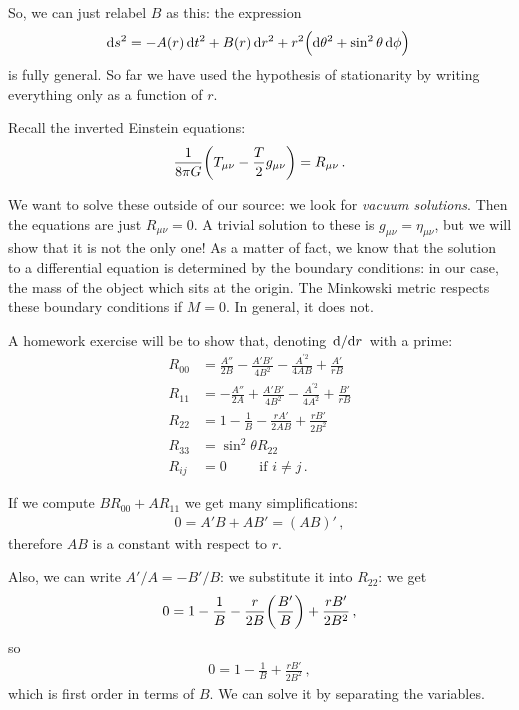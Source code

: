 \documentclass[main.tex]{subfiles}
\begin{document}
So, we can just relabel \(B\) as this: the expression 
%
\begin{align}
    \dd{s^2} = -A(r) \dd{t^2} + B(r) \dd{r^2} + r^2\qty(\dd{\theta^2} + \sin^2 \theta \dd{\phi })
\,
\end{align}
%
is fully general. So far we have used the hypothesis of stationarity by writing everything only as a function of \(r\).

Recall the inverted Einstein equations: 
%
\begin{align}
  \frac{1}{8 \pi G} \qty(T_{\mu \nu } - \frac{T}{2} g_{\mu \nu }) = R_{\mu \nu }
\,.
\end{align}
%

We want to solve these outside of our source: we look for \emph{vacuum solutions}. Then the equations are just \(R_{\mu \nu } =0\).
A trivial solution to these is \(g_{\mu \nu } = \eta_{\mu \nu }\), but we will show that it is not the only one!
As a matter of fact, we know that the solution to a differential equation is determined by the boundary conditions: in our case, the mass of the object which sits at the origin.
The Minkowski metric respects these boundary conditions if \(M=0\). In general, it does not.

A homework exercise will be to show that, denoting \(\dv*{}{r}\) with a prime: 
%
\begin{subequations}
\begin{align}
    R_{00} &= \frac{A''}{2B} - \frac{A' B'}{4B^2} - \frac{A^{\prime 2}}{4AB} + \frac{A'}{rB}  \\
    R_{11} &= -\frac{A''}{2A} + \frac{A' B'}{4B^2} - \frac{A^{\prime 2}}{4A^2} + \frac{B'}{rB} \\
    R_{22} &= 1 - \frac{1}{B} - \frac{r A' }{2 AB} + \frac{rB'}{2 B^2}  \\
    R_{33} &= \sin^2 \theta  R_{22} \\
    R_{ij} &= 0 \qquad \text{ if } i \neq j
\,.
\end{align}
\end{subequations}

If we compute \(BR_{00} + A R_{11}\) we get many simplifications:
%
\begin{align}
  0 = A'B + AB' = (AB)'
\,,
\end{align}
%
therefore \(AB\) is a constant with respect to \(r\).

Also, we can write \(A' / A = - B' / B\): we substitute it into \(R_{22}\): we get 
%
\begin{align}
  0= 1 - \frac{1}{B} - \frac{r}{2B} \qty(\frac{B'}{B}) + \frac{rB'}{2B^2}
\,,
\end{align}
%
so 
%
\begin{align}
  0 = 1 - \frac{1}{B} + \frac{rB'}{2B^2}
\,,
\end{align}
%
which is first order in terms of \(B\). We can solve it by separating the variables.
\end{document}
